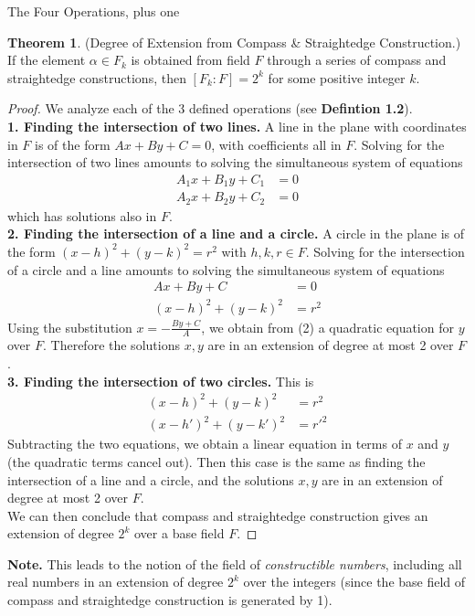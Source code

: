 \documentclass[12pt]{article}
\theoremstyle{definition}
\theoremstyle{definition}
\theoremstyle{definition}
\newtheorem{theorem}{Theorem}[section]
\theoremstyle{definition}
\theoremstyle{definition}
\theoremstyle{definition}
\theoremstyle{definition}
\begin{document}
\begin{section}{The Four Operations, plus one}
    \begin{theorem}{(Degree of Extension from Compass \& Straightedge Construction.)}
        If the element \(\alpha \in F_k\) is obtained from field \(F\) through a series of compass and straightedge constructions, then \([F_k : F] = 2^k\)
        for some positive integer \(k\).
        \begin{proof}
            We analyze each of the 3 defined operations (see \textbf{Defintion 1.2}).\\
            \break
            \noindent\textbf{1. Finding the intersection of two lines.} A line in the plane with coordinates in \(F\) is of the form \(Ax + By + C =0\), 
            with coefficients all in \(F\). Solving for the intersection of two lines amounts to solving the simultaneous system of equations 
            \begin{align*}
                A_1 x + B_1 y + C_1 &= 0\\
                A_2 x + B_2 y + C_2 &= 0
            \end{align*}
            which has solutions also in \(F\).\\
            \break
            \noindent\textbf{2. Finding the intersection of a line and a circle.} A circle in the plane is of the form \((x-h)^2 + (y-k)^2 = r^2\) with 
            \(h,k,r \in F\). Solving for the intersection of a circle and a line amounts to solving the simultaneous system of equations
            \begin{align}
                Ax + By + C &= 0\\
                (x-h)^2 + (y-k)^2 &= r^2
            \end{align}
            Using the substitution \(x = -\frac{By+C}{A}\), we obtain from (2) a quadratic equation for \(y\) over \(F\). Therefore the solutions \(x,y\)
            are in an extension of degree at most 2 over \(F\).\\
            \break
            \noindent\textbf{3. Finding the intersection of two circles.} This is 
            \begin{align*}
                (x-h)^2 + (y-k)^2 &= r^2\\
                (x-h')^2 + (y-k')^2 &= r'^2
            \end{align*}
            Subtracting the two equations, we obtain a linear equation in terms of \(x\) and \(y\) (the quadratic terms cancel out). Then this case is the same as 
            finding the intersection of a line and a circle, and the solutions \(x,y\) are in an extension of degree at most 2 over \(F\).\\
            \break
            We can then conclude that compass and straightedge construction gives an extension of degree \(2^k\) over a base field \(F\).
        \end{proof}
        \noindent\textbf{Note.} This leads to the notion of the field of \textit{constructible numbers}, including all real numbers in an extension of degree 
        \(2^k\) over the integers (since the base field of compass and straightedge construction is generated by 1).
    \end{theorem}
\end{section}
\end{document}
